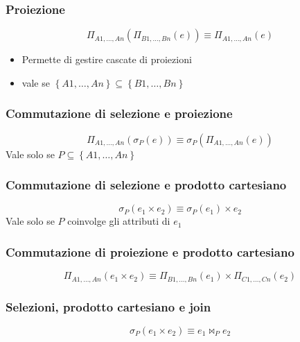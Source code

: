 \documentclass[12pt]{article}
\begin{document}
\subsubsection{Proiezione}
\begin{equation*}
    \Pi_{A1,\ldots,An}(\Pi_{B1,\ldots,Bn}(e))\equiv \Pi_{A1,\ldots,An}(e)
\end{equation*}
\begin{itemize}
    \item Permette di gestire cascate di proiezioni
    \item vale se $\left\{A1,\ldots,An\right\}\subseteq \left\{B1,\ldots,Bn\right\}$
\end{itemize}
\subsubsection{Commutazione di selezione e proiezione}
\begin{equation*}
    \Pi_{A1,\ldots,An}(\sigma_{P}(e))\equiv \sigma_{P}(\Pi_{A1,\ldots,An}(e))
\end{equation*}
Vale solo se $P \subseteq \left\{A1,\ldots,An\right\}$
\subsubsection{Commutazione di selezione e prodotto cartesiano}
\begin{equation*}
    \sigma_{P}(e_{1}\times e_{2}) \equiv \sigma_{P}(e_{1})\times e_{2}
\end{equation*}
Vale solo se $P$ coinvolge gli attributi di $e_{1}$
\subsubsection{Commutazione di proiezione e prodotto cartesiano}
\begin{equation*}
    \Pi_{A1,\ldots,An}(e_{1}\times e_{2})\equiv \Pi_{B1,\ldots,Bn}(e_{1}) \times \Pi_{C1,\ldots,Cn}(e_{2})
\end{equation*}
\subsubsection{Selezioni, prodotto cartesiano e join}
\begin{equation*}
    \sigma_{P}(e_{1} \times e_{2}) \equiv e_{1}\Join_{P}  e_{2}
\end{equation*}
\end{document}
